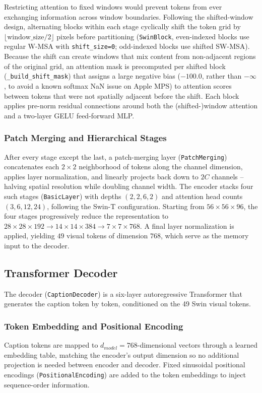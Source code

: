 \documentclass[conference]{IEEEtran}
\begin{document}
Restricting attention to fixed windows would prevent tokens from ever exchanging information across window boundaries. Following the shifted-window design, alternating blocks within each stage cyclically shift the token grid by $\lfloor \text{window\_size}/2 \rfloor$ pixels before partitioning (\texttt{SwinBlock}, even-indexed blocks use regular W-MSA with \texttt{shift\_size=0}; odd-indexed blocks use shifted SW-MSA). Because the shift can create windows that mix content from non-adjacent regions of the original grid, an attention mask is precomputed per shifted block (\texttt{\_build\_shift\_mask}) that assigns a large negative bias ($-100.0$, rather than $-\infty$, to avoid a known softmax NaN issue on Apple MPS) to attention scores between tokens that were not spatially adjacent before the shift. Each block applies pre-norm residual connections around both the (shifted-)window attention and a two-layer GELU feed-forward MLP.

\subsubsection{Patch Merging and Hierarchical Stages}
After every stage except the last, a patch-merging layer (\texttt{PatchMerging}) concatenates each $2\times2$ neighborhood of tokens along the channel dimension, applies layer normalization, and linearly projects back down to $2C$ channels -- halving spatial resolution while doubling channel width. The encoder stacks four such stages (\texttt{BasicLayer}) with depths $(2,2,6,2)$ and attention head counts $(3,6,12,24)$, following the Swin-T configuration. Starting from $56\times56\times96$, the four stages progressively reduce the representation to $28\times28\times192 \rightarrow 14\times14\times384 \rightarrow 7\times7\times768$. A final layer normalization is applied, yielding $49$ visual tokens of dimension $768$, which serve as the memory input to the decoder.

\subsection{Transformer Decoder}
\label{sec:method-decoder}

The decoder (\texttt{CaptionDecoder}) is a six-layer autoregressive Transformer that generates the caption token by token, conditioned on the 49 Swin visual tokens.

\subsubsection{Token Embedding and Positional Encoding}
Caption tokens are mapped to $d_{model}=768$-dimensional vectors through a learned embedding table, matching the encoder's output dimension so no additional projection is needed between encoder and decoder. Fixed sinusoidal positional encodings (\texttt{PositionalEncoding}) are added to the token embeddings to inject sequence-order information.
\end{document}
